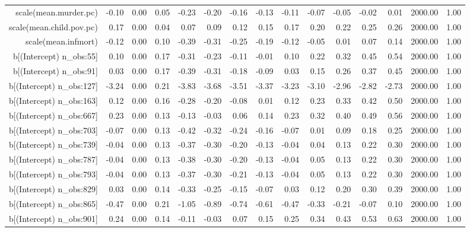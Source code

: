 \begin{table}[ht]
\begin{tabular}{rrrrrrrrrrrrrrr}
  scale(mean.murder.pc) & -0.10 & 0.00 & 0.05 & -0.23 & -0.20 & -0.16 & -0.13 & -0.11 & -0.07 & -0.05 & -0.02 & 0.01 & 2000.00 & 1.00 \\ 
  scale(mean.child.pov.pc) & 0.17 & 0.00 & 0.04 & 0.07 & 0.09 & 0.12 & 0.15 & 0.17 & 0.20 & 0.22 & 0.25 & 0.26 & 2000.00 & 1.00 \\ 
  scale(mean.infmort) & -0.12 & 0.00 & 0.10 & -0.39 & -0.31 & -0.25 & -0.19 & -0.12 & -0.05 & 0.01 & 0.07 & 0.14 & 2000.00 & 1.00 \\ 
  b[(Intercept) n\_obs:55] & 0.10 & 0.00 & 0.17 & -0.31 & -0.23 & -0.11 & -0.01 & 0.10 & 0.22 & 0.32 & 0.45 & 0.54 & 2000.00 & 1.00 \\ 
  b[(Intercept) n\_obs:91] & 0.03 & 0.00 & 0.17 & -0.39 & -0.31 & -0.18 & -0.09 & 0.03 & 0.15 & 0.26 & 0.37 & 0.45 & 2000.00 & 1.00 \\ 
  b[(Intercept) n\_obs:127] & -3.24 & 0.00 & 0.21 & -3.83 & -3.68 & -3.51 & -3.37 & -3.23 & -3.10 & -2.96 & -2.82 & -2.73 & 2000.00 & 1.00 \\ 
  b[(Intercept) n\_obs:163] & 0.12 & 0.00 & 0.16 & -0.28 & -0.20 & -0.08 & 0.01 & 0.12 & 0.23 & 0.33 & 0.42 & 0.50 & 2000.00 & 1.00 \\ 
  b[(Intercept) n\_obs:667] & 0.23 & 0.00 & 0.13 & -0.13 & -0.03 & 0.06 & 0.14 & 0.23 & 0.32 & 0.40 & 0.49 & 0.56 & 2000.00 & 1.00 \\ 
  b[(Intercept) n\_obs:703] & -0.07 & 0.00 & 0.13 & -0.42 & -0.32 & -0.24 & -0.16 & -0.07 & 0.01 & 0.09 & 0.18 & 0.25 & 2000.00 & 1.00 \\ 
  b[(Intercept) n\_obs:739] & -0.04 & 0.00 & 0.13 & -0.37 & -0.30 & -0.20 & -0.13 & -0.04 & 0.04 & 0.13 & 0.22 & 0.30 & 2000.00 & 1.00 \\ 
  b[(Intercept) n\_obs:787] & -0.04 & 0.00 & 0.13 & -0.38 & -0.30 & -0.20 & -0.13 & -0.04 & 0.05 & 0.13 & 0.22 & 0.30 & 2000.00 & 1.00 \\ 
  b[(Intercept) n\_obs:793] & -0.04 & 0.00 & 0.13 & -0.37 & -0.30 & -0.21 & -0.13 & -0.04 & 0.05 & 0.13 & 0.22 & 0.30 & 2000.00 & 1.00 \\ 
  b[(Intercept) n\_obs:829] & 0.03 & 0.00 & 0.14 & -0.33 & -0.25 & -0.15 & -0.07 & 0.03 & 0.12 & 0.20 & 0.30 & 0.39 & 2000.00 & 1.00 \\ 
  b[(Intercept) n\_obs:865] & -0.47 & 0.00 & 0.21 & -1.05 & -0.89 & -0.74 & -0.61 & -0.47 & -0.33 & -0.21 & -0.07 & 0.10 & 2000.00 & 1.00 \\ 
  b[(Intercept) n\_obs:901] & 0.24 & 0.00 & 0.14 & -0.11 & -0.03 & 0.07 & 0.15 & 0.25 & 0.34 & 0.43 & 0.53 & 0.63 & 2000.00 & 1.00 \\ 

\end{tabular}
\end{table}
